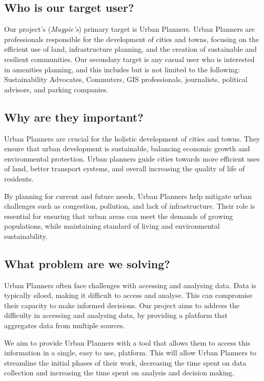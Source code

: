 \subsection{Who is our target user?}
Our project's (\textit{Magpie's}) primary target is Urban Planners. Urban
Planners are professionals responsible for the development of cities and towns,
focusing on the efficient use of land, infrastructure planning, and the creation
of sustainable and resilient communities. Our secondary target is any casual
user who is interested in amenities planning, and this includes but is not
limited to the following: Sustainability Advocates, Commuters, GIS
professionals, journalists, political advisors, and parking companies.

\subsection{Why are they important?}
Urban Planners are crucial for the holistic development of cities and towns.
They ensure that urban development is sustainable, balancing economic growth and
environmental protection. Urban planners guide cities towards more efficient
uses of land, better transport systems, and overall increasing the quality of
life of residents.

By planning for current and future needs, Urban Planners help mitigate urban
challenges such as congestion, pollution, and lack of infrastructure. Their role
is essential for ensuring that urban areas can meet the demands of growing
populations, while maintaining standard of living and environmental
sustainability.

\subsection{What problem are we solving?}
Urban Planners often face challenges with accessing and analysing data. Data is
typically siloed, making it difficult to access and analyse. This can compromise
their capacity to make informed decisions. Our project aims to address the
difficulty in accessing and analysing data, by providing a platform that
aggregates data from multiple sources.

We aim to provide Urban Planners with a tool that allows them to access this
information in a single, easy to use, platform. This will allow Urban Planners
to streamline the initial phases of their work, decreasing the time spent on
data collection and increasing the time spent on analysis and decision making.

\newpage{}